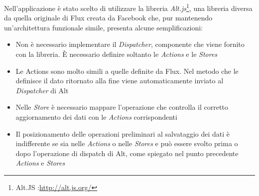 Nell'applicazione è stato scelto di utilizzare la libreria \emph{Alt.js}\footnote{Alt.JS :\url{http://alt.js.org/}}, una libreria diversa da quella originale di Flux creata da Facebook che, pur mantenendo un'architettura funzionale simile, presenta alcune semplificazioni:
\begin{itemize}
	\item Non è necessario implementare il \emph{Dispatcher}, componente che viene fornito con la libreria. È necessario definire soltanto le \emph{Actions}  e le \emph{Stores}
	\item Le Actions sono molto simili a quelle definite da Flux. Nel metodo che le definisce il dato ritornato alla fine viene automaticamente inviato al \emph{Dispatcher} di Alt
	\item Nelle \emph{Store} è necessario mappare l'operazione che controlla il corretto aggiornamento dei dati con le \emph{Actions} corrispondenti
	\item Il posizionamento delle operazioni preliminari al salvataggio dei dati è indifferente se sia nelle \emph{Actions} o nelle \emph{Stores} e può essere svolto prima o dopo l'operazione di dispatch di Alt, come spiegato nel punto precedente \emph{Actions} e \emph{Stores}
\end{itemize}

